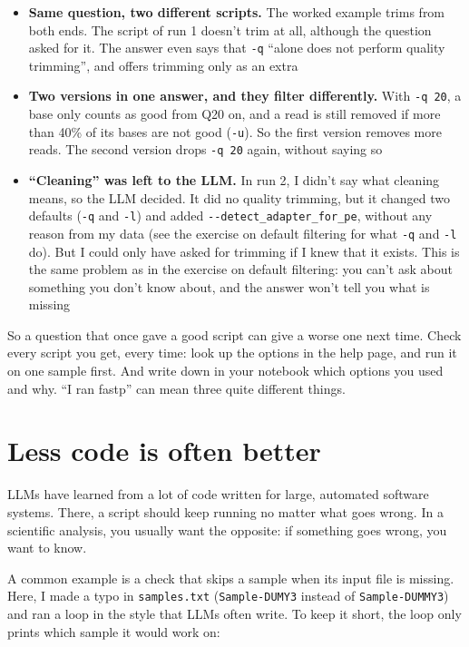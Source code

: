 \documentclass[
  letterpaper,
  DIV=11,
  numbers=noendperiod]{scrreprt}
\providecommand{\tightlist}{%
  \setlength{\itemsep}{0pt}\setlength{\parskip}{0pt}}
\begin{document}
\begin{tcolorbox}
\begin{itemize}
\tightlist
\item
  \textbf{Same question, two different scripts.} The worked example
  trims from both ends. The script of run 1 doesn't trim at all,
  although the question asked for it. The answer even says that
  \texttt{-q} ``alone does not perform quality trimming'', and offers
  trimming only as an extra
\item
  \textbf{Two versions in one answer, and they filter differently.} With
  \texttt{-q\ 20}, a base only counts as good from Q20 on, and a read is
  still removed if more than 40\% of its bases are not good
  (\texttt{-u}). So the first version removes more reads. The second
  version drops \texttt{-q\ 20} again, without saying so
\item
  \textbf{``Cleaning'' was left to the LLM.} In run 2, I didn't say what
  cleaning means, so the LLM decided. It did no quality trimming, but it
  changed two defaults (\texttt{-q} and \texttt{-l}) and added
  \texttt{-\/-detect\_adapter\_for\_pe}, without any reason from my data
  (see the exercise on default filtering for what \texttt{-q} and
  \texttt{-l} do). But I could only have asked for trimming if I knew
  that it exists. This is the same problem as in the exercise on default
  filtering: you can't ask about something you don't know about, and the
  answer won't tell you what is missing
\end{itemize}

So a question that once gave a good script can give a worse one next
time. Check every script you get, every time: look up the options in the
help page, and run it on one sample first. And write down in your
notebook which options you used and why. ``I ran fastp'' can mean three
quite different things.

\end{tcolorbox}

\section{Less code is often better}\label{less-code-is-often-better}

LLMs have learned from a lot of code written for large, automated
software systems. There, a script should keep running no matter what
goes wrong. In a scientific analysis, you usually want the opposite: if
something goes wrong, you want to know.

A common example is a check that skips a sample when its input file is
missing. Here, I made a typo in \texttt{samples.txt}
(\texttt{Sample-DUMY3} instead of \texttt{Sample-DUMMY3}) and ran a loop
in the style that LLMs often write. To keep it short, the loop only
prints which sample it would work on:
\end{document}
